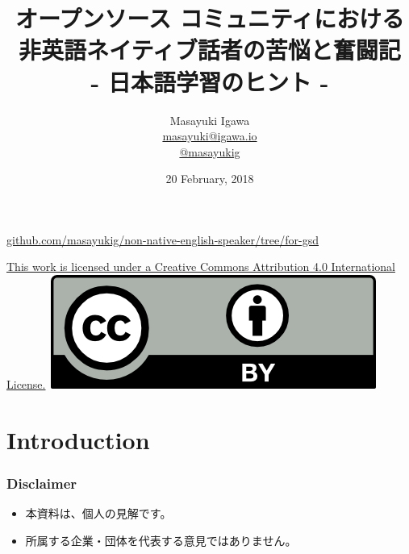 \documentclass[aspectratio=169,11pt,hyperref={colorlinks=true}]{beamer}
\author[Dong Ma, Samuel de Medeiros and Masayuki Igawa]{%
  \texorpdfstring{%
    \centering
    Masayuki Igawa\\
    \href{mailto:masayuki@igawa.io}{masayuki@igawa.io}\\
    \href{https://twitter.com/masayukig}{@masayukig}
  }
  {Dong Ma, Samuel de Medeiros and Masayuki Igawa}
}
\date{20 February, 2018}
\title[Non-Native-English-Speaker
\hspace{2em}\insertframenumber/\inserttotalframenumber]{オープンソース
  コミュニティにおける\\非英語ネイティブ話者の苦悩と奮闘記\\
  - 日本語学習のヒント -}
\begin{document}
{%
\begin{frame}[noframenumbering]
  \hypersetup{colorlinks,urlcolor=suse}
  \titlepage{}
  \centering
  \@place \par
  \href{https://github.com/masayukig/non-native-english-speaker/tree/for-gsd}{github.com/masayukig/non-native-english-speaker/tree/for-gsd}\\
  \vspace{1em}
  \begin{flushright}
    \tiny\href{https://creativecommons.org/licenses/by/4.0/}{This work
      is licensed under a Creative Commons Attribution 4.0
      International License.}~\includegraphics[scale=0.3]{cc_by.png}
  \end{flushright}
\end{frame}
}


\section{Introduction}
\begin{frame}
  \frametitle{Disclaimer}
  \begin{itemize}
    \item 本資料は、個人の見解です。
    \item 所属する企業・団体を代表する意見ではありません。
  \end{itemize}
\end{frame}
\end{document}

